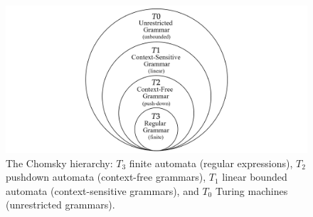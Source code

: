 \begin{figure}[h]
    \centering
    \includegraphics[width=\textwidth]{Sections/Parse/chom.png}
    \caption{
        The Chomsky hierarchy: 
        $T_3$ finite automata (regular expressions), 
        $T_2$ pushdown automata (context-free grammars),
        $T_1$ linear bounded automata (context-sensitive grammars),
        and $T_0$ Turing machines (unrestricted grammars).
    } 
    \label{fig:chomsky}
\end{figure}

